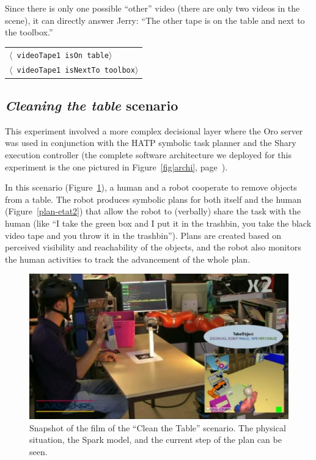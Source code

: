 \documentclass[preprint,3p,times]{elsarticle}
\newcommand{\stmt}[1]{{\footnotesize \tt $\langle$ #1\relax$\rangle$}}
\begin{document}
Since there is only one possible ``other'' video (there are only two videos in
the scene), it can directly answer Jerry: ``The other tape is on the table and
next to the toolbox.''

\begin{center}
\begin{tabular}{l}
\stmt{videoTape1 isOn table}\\
\stmt{videoTape1 isNextTo toolbox}
\end{tabular}
\end{center}


\subsection{\emph{Cleaning the table} scenario}

This experiment involved a more complex decisional layer where the {\sc Oro} server
was used in conjunction with the HATP symbolic task planner and the {\sc Shary}
execution controller (the complete software architecture we deployed for this
experiment is the one pictured in Figure~\ref{fig|archi},
page~\pageref{fig|archi}).

In this scenario (Figure~\ref{fig|cleantable-video}), a human and a robot
cooperate to remove objects from a table. The robot produces symbolic plans for
both itself and the human (Figure~\ref{plan-etat2})
that allow the robot to (verbally) share the task with the human (like ``I take
the green box and I put it in the trashbin, you take the black video tape and
you throw it in the trashbin''). Plans are created based on perceived
visibility and reachability of the objects, and the robot also monitors the
human activities to track the advancement of the whole plan.

\begin{figure}
    \centering
    \includegraphics[width=0.7\columnwidth]{cleantable.jpg}

    \caption{Snapshot of the film of the ``Clean the Table'' scenario. The
    physical situation, the {\sc Spark} model, and the current step of the plan can
    be seen.}

    \label{fig|cleantable-video}
\end{figure}
\end{document}
